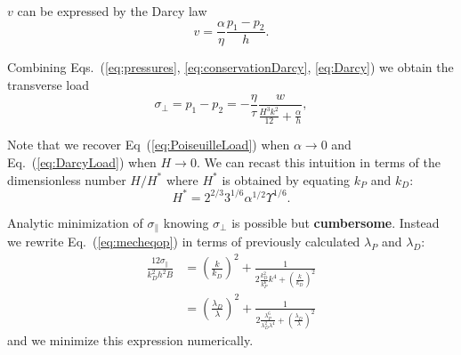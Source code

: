 \documentclass[twocolumn,superscriptaddress,showpacs,preprintnumbers,
amsmath,amssymb,prl]{revtex4-1}
\newcommand{\seb}[1]{\textbf{\color{blue}#1}} %
\begin{document}
$v$ can be expressed by the Darcy law
\begin{equation}
v = \frac{\alpha}{\eta} \frac{p_1-p_2}{h}.
\label{eq:Darcy}
\end{equation}

Combining Eqs.~(\ref{eq:pressures}, \ref{eq:conservationDarcy}, \ref{eq:Darcy}) we obtain the transverse load
\begin{equation}
\sigma_\perp = p_1-p_2 = - \frac{\eta}{\tau} \frac{w}{\frac{H^3 k^2}{12} + \frac{\alpha}{h}},
\label{eq:MixtLoad}
\end{equation}

Note that we recover Eq~(\ref{eq:PoiseuilleLoad}) when $\alpha \rightarrow 0$ and Eq.~(\ref{eq:DarcyLoad}) when $H \rightarrow 0$. We can recast this intuition in terms of the dimensionless number $H/H^*$ where $H^*$ is obtained by equating $k_P$ and $k_D$:
\begin{equation}
H^* = 2^{2/3} 3^{1/6} \alpha^{1/2} \Upsilon^{1/6}.
\end{equation}

Analytic minimization of $\sigma_\parallel$ knowing $\sigma_\perp$ is possible but \seb{cumbersome}. Instead we rewrite Eq.~(\ref{eq:mecheqop}) in terms of previously calculated $\lambda_P$ and $\lambda_D$:
\begin{align}
\frac{12\sigma_\parallel}{k_D^2 h^2 B} &= \left(\frac{k}{k_D}\right)^2 + \frac{1}{2\frac{k_D^2}{k_P^6}k^4  + \left(\frac{k}{k_D}\right)^2}\\
&= \left(\frac{\lambda_D}{\lambda}\right)^2 + \frac{1}{2\frac{\lambda_P^6}{\lambda_D^2\lambda^4}  + \left(\frac{\lambda_D}{\lambda}\right)^2}
\end{align}
and we minimize this expression numerically.
\end{document}
